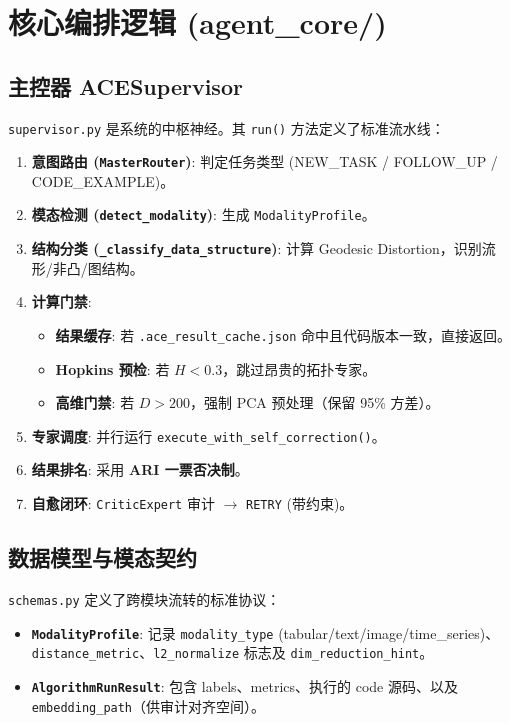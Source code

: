\documentclass[12pt,a4paper]{article}
\begin{document}
\section{核心编排逻辑 (agent\_core/)}

\subsection{主控器 ACESupervisor}

\texttt{supervisor.py} 是系统的中枢神经。其 \texttt{run()} 方法定义了标准流水线：

\begin{enumerate}[nosep]
    \item \textbf{意图路由 (\texttt{MasterRouter})}: 判定任务类型 (NEW\_TASK / FOLLOW\_UP / CODE\_EXAMPLE)。
    \item \textbf{模态检测 (\texttt{detect\_modality})}: 生成 \texttt{ModalityProfile}。
    \item \textbf{结构分类 (\texttt{\_classify\_data\_structure})}: 计算 Geodesic Distortion，识别流形/非凸/图结构。
    \item \textbf{计算门禁}:
    \begin{itemize}
        \item \textbf{结果缓存}: 若 \texttt{.ace\_result\_cache.json} 命中且代码版本一致，直接返回。
        \item \textbf{Hopkins 预检}: 若 $H < 0.3$，跳过昂贵的拓扑专家。
        \item \textbf{高维门禁}: 若 $D > 200$，强制 PCA 预处理（保留 95\% 方差）。
    \end{itemize}
    \item \textbf{专家调度}: 并行运行 \texttt{execute\_with\_self\_correction()}。
    \item \textbf{结果排名}: 采用 \textbf{ARI 一票否决制}。
    \item \textbf{自愈闭环}: \texttt{CriticExpert} 审计 $\rightarrow$ \texttt{RETRY} (带约束)。
\end{enumerate}

\subsection{数据模型与模态契约}

\texttt{schemas.py} 定义了跨模块流转的标准协议：
\begin{itemize}
    \item \textbf{\texttt{ModalityProfile}}: 记录 \texttt{modality\_type} (tabular/text/image/time\_series)、\texttt{distance\_metric}、\texttt{l2\_normalize} 标志及 \texttt{dim\_reduction\_hint}。
    \item \textbf{\texttt{AlgorithmRunResult}}: 包含 labels、metrics、执行的 code 源码、以及 \texttt{embedding\_path}（供审计对齐空间）。
\end{itemize}
\end{document}
